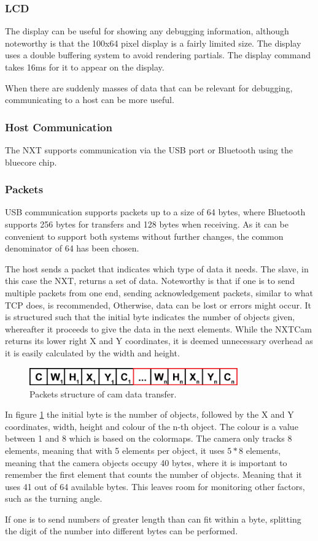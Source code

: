 \subsubsection*{LCD}
The display can be useful for showing any debugging information, although noteworthy is that the 100x64 pixel display is a fairly limited size. The display uses a double buffering system to avoid rendering partials. The display command takes 16ms for it to appear on the display.

When there are suddenly masses of data that can be relevant for debugging, communicating to a host can be more useful.

\subsubsection*{Host Communication}
The NXT supports communication via the USB port or Bluetooth using the bluecore chip.

\subsubsection*{Packets}
USB communication supports packets up to a size of 64 bytes, where Bluetooth supports 256 bytes for transfers and 128 bytes when receiving. As it can be convenient to support both systems without further changes, the common denominator of 64 has been chosen.

The host sends a packet that indicates which type of data it needs. The slave, in this case the NXT, returns a set of data. Noteworthy is that if one is to send multiple packets from one end, sending acknowledgement packets, similar to what TCP does, is recommended, Otherwise, data can be lost or errors might occur.
It is structured such that the initial byte indicates the number of objects given, whereafter it proceeds to give the data in the next elements. While the NXTCam returns its lower right X and Y coordinates, it is deemed unnecessary overhead as it is easily calculated by the width and height.

\begin{figure}[H]
    \label{software_packet_cam}
    \centering
    \includegraphics[width=0.8\textwidth]{Images/Software/NXT/packet_cam.png}
    \caption{Packets structure of cam data transfer.}
\end{figure}

In figure \ref{software_packet_cam} the initial byte is the number of objects, followed by the X and Y coordinates, width, height and colour of the n-th object. The colour is a value between 1 and 8 which is based on the colormaps. 
The camera only tracks 8 elements, meaning that with 5 elements per object, it uses $5 * 8$ elements, meaning that the camera objects occupy 40 bytes, where it is important to remember the first element that counts the number of objects. Meaning that it uses 41 out of 64 available bytes.
This leaves room for monitoring other factors, such as the turning angle.

If one is to send numbers of greater length than can fit within a byte, splitting the digit of the number into different bytes can be performed.
